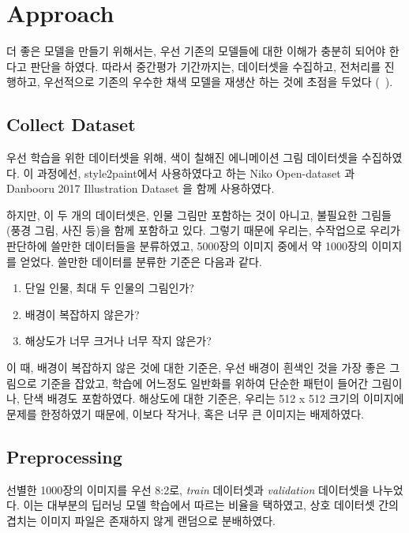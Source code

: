 \section{Approach}

더 좋은 모델을 만들기 위해서는, 우선 기존의 모델들에 대한 이해가 충분히 되어야 한다고 판단을 하였다.
따라서 중간평가 기간까지는, 데이터셋을 수집하고, 전처리를 진행하고, 우선적으로 기존의 우수한  채색 모델을 재생산 하는 것에 초점을 두었다 (\stylepaint~\cite{Zhang2017}).

\subsection{Collect Dataset}

우선 학습을 위한 데이터셋을 위해, 색이 칠해진 에니메이션 그림 데이터셋을 수집하였다.
이 과정에선, style2paint에서 사용하였다고 하는 Niko Open-dataset \cite{ikuta2016}과 Danbooru 2017 Illustration Dataset \cite{danbooru2017}을 함께 사용하였다.

하지만, 이 두 개의 데이터셋은, 인물 그림만 포함하는 것이 아니고, 불필요한 그림들 (풍경 그림, 사진 등)을 함께 포함하고 있다.
그렇기 때문에 우리는, 수작업으로 우리가 판단하에 쓸만한 데이터들을 분류하였고, 5000장의 이미지 중에서 약 1000장의 이미지를 얻었다.
쓸만한 데이터를 분류한 기준은 다음과 같다.
\begin{enumerate}[topsep=0pt,itemsep=-1ex,partopsep=1ex,parsep=1ex]
	\item 단일 인물, 최대 두 인물의 그림인가?
	\item 배경이 복잡하지 않은가?
	\item 해상도가 너무 크거나 너무 작지 않은가?
\end{enumerate}
이 때, 배경이 복잡하지 않은 것에 대한 기준은, 우선 배경이 흰색인 것을 가장 좋은 그림으로 기준을 잡았고, 학습에 어느정도 일반화를 위하여 단순한 패턴이 들어간 그림이나, 단색 배경도 포함하였다. 해상도에 대한 기준은, 우리는 512 x 512 크기의 이미지에 문제를 한정하였기 때문에, 이보다 작거나, 혹은 너무 큰 이미지는 배제하였다.

\subsection{Preprocessing}

선별한 1000장의 이미지를 우선 8:2로, \textit{train} 데이터셋과 \textit{validation} 데이터셋을 나누었다.
이는 대부분의 딥러닝 모델 학습에서 따르는 비율을 택하였고, 상호 데이터셋 간의 겹치는 이미지 파일은 존재하지 않게 랜덤으로 분배하였다.

